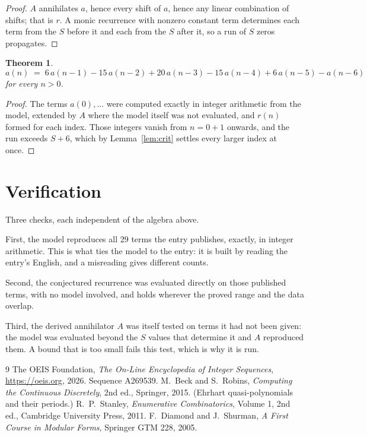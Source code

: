 \documentclass[11pt,a4paper]{article}
\theoremstyle{plain}
\newtheorem{theorem}{Theorem}
\theoremstyle{definition}
\begin{document}
\begin{proof}
$A$ annihilates $a$, hence every shift of $a$, hence any linear combination of shifts; that is
$r$. A monic recurrence with nonzero constant term determines each term from the $S$ before it
and each from the $S$ after it, so a run of $S$ zeros propagates.
\end{proof}

\begin{theorem}
\[
a(n)\;=\;6\,a(n-1) - 15\,a(n-2) + 20\,a(n-3) - 15\,a(n-4) + 6\,a(n-5) - a(n-6)
\]
for every $n>0$.
\end{theorem}

\begin{proof}
The terms $a(0),\dots$ were computed exactly in integer arithmetic from the model, extended by
$A$ where the model itself was not evaluated, and $r(n)$ formed for each index. Those integers
vanish from $n=0+1$ onwards, and the run exceeds $S+6$, which by
Lemma~\ref{lem:crit} settles every larger index at once.
\end{proof}

\section{Verification}

Three checks, each independent of the algebra above.

First, the model reproduces all $29$ terms the entry publishes, exactly, in integer
arithmetic. This is what ties the model to the entry: it is built by reading the entry's
English, and a misreading gives different counts.

Second, the conjectured recurrence was evaluated directly on those published terms, with no
model involved, and holds wherever the proved range and the data overlap.

Third, the derived annihilator $A$ was itself tested on terms it had not been given: the model
was evaluated beyond the $S$ values that determine it and $A$ reproduced them. A bound that is
too small fails this test, which is why it is run.

\begin{thebibliography}{9}
 The OEIS Foundation, \emph{The On-Line Encyclopedia of Integer
Sequences}, \url{https://oeis.org}, 2026. Sequence A269539.
 M.~Beck and S.~Robins, \emph{Computing the Continuous Discretely},
2nd ed., Springer, 2015. (Ehrhart quasi-polynomials and their periods.)
 R.~P.~Stanley, \emph{Enumerative Combinatorics}, Volume 1, 2nd ed.,
Cambridge University Press, 2011.
 F.~Diamond and J.~Shurman, \emph{A First Course in Modular Forms},
Springer GTM 228, 2005.
\end{thebibliography}
\end{document}
